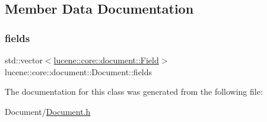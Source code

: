 \subsection{Member Data Documentation}
\mbox{\label{classlucene_1_1core_1_1document_1_1Document_af9530ebe88523c7b14063d7efeccf987}} 
\subsubsection{\texorpdfstring{fields}{fields}}
{\footnotesize\ttfamily std\+::vector$<$\mbox{\hyperlink{classlucene_1_1core_1_1document_1_1Field}{lucene\+::core\+::document\+::\+Field}}$>$ lucene\+::core\+::document\+::\+Document\+::fields\hspace{0.3cm}{\ttfamily [private]}}



The documentation for this class was generated from the following file\+:\begin{DoxyCompactItemize}
\item 
Document/\mbox{\hyperlink{Document_8h}{Document.\+h}}\end{DoxyCompactItemize}
